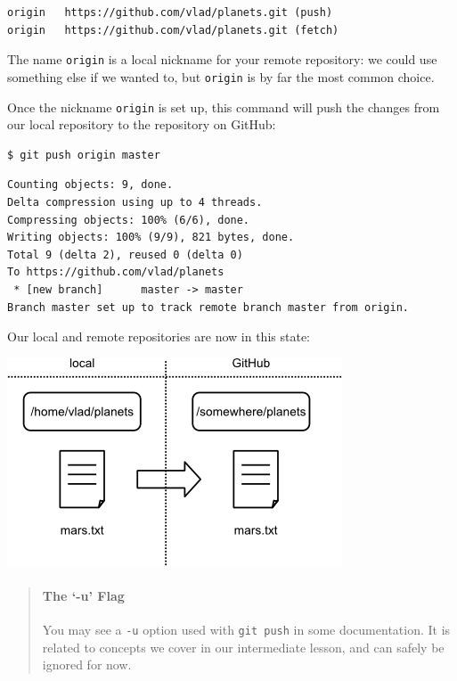 \documentclass[]{book}
\begin{document}
\begin{verbatim}
origin   https://github.com/vlad/planets.git (push)
origin   https://github.com/vlad/planets.git (fetch)
\end{verbatim}

The name \texttt{origin} is a local nickname for your remote repository:
we could use something else if we wanted to, but \texttt{origin} is by
far the most common choice.

Once the nickname \texttt{origin} is set up, this command will push the
changes from our local repository to the repository on GitHub:

\begin{verbatim}
$ git push origin master
\end{verbatim}

\begin{verbatim}
Counting objects: 9, done.
Delta compression using up to 4 threads.
Compressing objects: 100% (6/6), done.
Writing objects: 100% (9/9), 821 bytes, done.
Total 9 (delta 2), reused 0 (delta 0)
To https://github.com/vlad/planets
 * [new branch]      master -> master
Branch master set up to track remote branch master from origin.
\end{verbatim}

Our local and remote repositories are now in this state:

\includegraphics{novice/git/img/github-repo-after-first-push.png}

\begin{quote}
\mbox{}\paragraph{The `-u' Flag}

You may see a \texttt{-u} option used with \texttt{git push} in some
documentation. It is related to concepts we cover in our intermediate
lesson, and can safely be ignored for now.
\end{quote}
\end{document}
